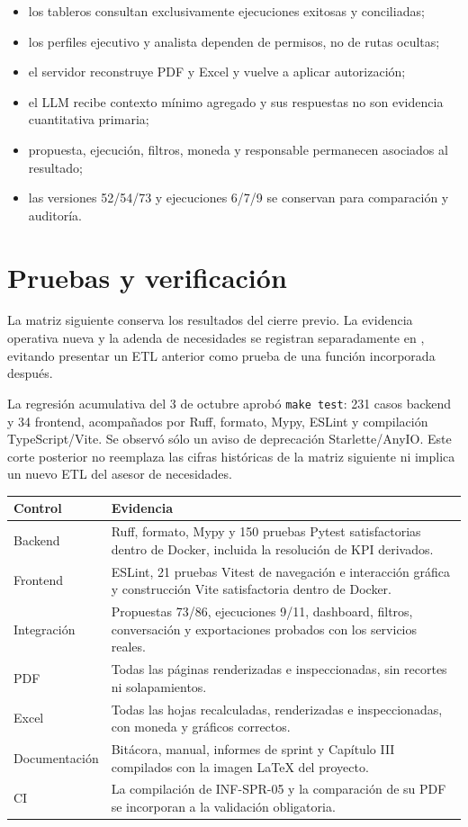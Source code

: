 \documentclass[11pt,letterpaper]{article}
\newcommand{\file}[1]{\texttt{#1}}
\begin{document}
\begin{itemize}
  \item los tableros consultan exclusivamente ejecuciones exitosas y conciliadas;
  \item los perfiles ejecutivo y analista dependen de permisos, no de rutas ocultas;
  \item el servidor reconstruye PDF y Excel y vuelve a aplicar autorización;
  \item el LLM recibe contexto mínimo agregado y sus respuestas no son evidencia cuantitativa primaria;
  \item propuesta, ejecución, filtros, moneda y responsable permanecen asociados al resultado;
  \item las versiones 52/54/73 y ejecuciones 6/7/9 se conservan para comparación y auditoría.
\end{itemize}

\section{Pruebas y verificación}

La matriz siguiente conserva los resultados del cierre previo. La evidencia operativa
nueva y la adenda de necesidades se registran separadamente en
, evitando presentar un ETL
anterior como prueba de una función incorporada después.

La regresión acumulativa del 3 de octubre aprobó \file{make test}: 231 casos backend
y 34 frontend, acompañados por Ruff, formato, Mypy, ESLint y compilación
TypeScript/Vite. Se observó sólo un aviso de deprecación Starlette/AnyIO. Este corte
posterior no reemplaza las cifras históricas de la matriz siguiente ni implica un
nuevo ETL del asesor de necesidades.

\begin{tabularx}{\textwidth}{@{}p{}X@{}}
  \toprule
  Control & Evidencia \\
  \midrule
  Backend & Ruff, formato, Mypy y 150 pruebas Pytest satisfactorias dentro de Docker, incluida la resolución de KPI derivados. \\
  Frontend & ESLint, 21 pruebas Vitest de navegación e interacción gráfica y construcción Vite satisfactoria dentro de Docker. \\
  Integración & Propuestas 73/86, ejecuciones 9/11, dashboard, filtros, conversación y exportaciones probados con los servicios reales. \\
  PDF & Todas las páginas renderizadas e inspeccionadas, sin recortes ni solapamientos. \\
  Excel & Todas las hojas recalculadas, renderizadas e inspeccionadas, con moneda y gráficos correctos. \\
  Documentación & Bitácora, manual, informes de sprint y Capítulo III compilados con la imagen LaTeX del proyecto. \\
  CI & La compilación de INF-SPR-05 y la comparación de su PDF se incorporan a la validación obligatoria. \\
  \bottomrule
\end{tabularx}
\end{document}
